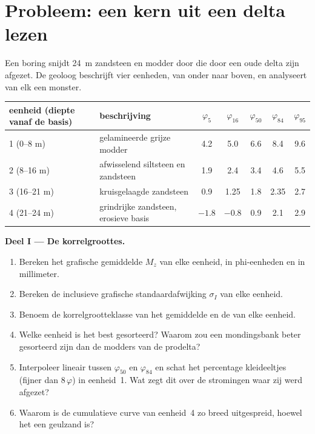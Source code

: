 \section{Probleem: een kern uit een delta lezen}

\begin{problem}
\label{pb:b1:clastic-sediments:1}
Een boring snijdt \qty{24}{m} zandsteen en modder door die door een oude delta
zijn afgezet. De geoloog beschrijft vier eenheden, van onder naar boven, en
analyseert van elk een monster.

\smallskip
\begin{center}\small
\begin{tabular}{@{}llccccc@{}}
\hline
eenheid (diepte vanaf de basis) & beschrijving & $\varphi_5$ & $\varphi_{16}$ & $\varphi_{50}$ & $\varphi_{84}$ & $\varphi_{95}$ \\
\hline
1 (0--8 m) & gelamineerde grijze modder & 4.2 & 5.0 & 6.6 & 8.4 & 9.6 \\
2 (8--16 m) & afwisselend siltsteen en zandsteen & 1.9 & 2.4 & 3.4 & 4.6 & 5.5 \\
3 (16--21 m) & kruisgelaagde zandsteen & 0.9 & 1.25 & 1.8 & 2.35 & 2.7 \\
4 (21--24 m) & grindrijke zandsteen, erosieve basis & $-1.8$ & $-0.8$ & 0.9 & 2.1 & 2.9 \\
\hline
\end{tabular}
\end{center}

\medskip
\noindent\textbf{Deel I --- De korrelgroottes.}
\begin{enumerate}
  \item Bereken het grafische gemiddelde $M_z$ van elke eenheid, in phi-eenheden
        en in millimeter.
  \item Bereken de inclusieve grafische standaardafwijking $\sigma_I$ van elke
        eenheid.
  \item Benoem de korrelgrootteklasse van het gemiddelde en de  van
        elke eenheid.
  \item Welke eenheid is het best gesorteerd? Waarom zou een mondingsbank beter
        gesorteerd zijn dan de modders van de prodelta?
  \item Interpoleer lineair tussen $\varphi_{50}$ en $\varphi_{84}$ en schat het
        percentage kleideeltjes (fijner dan $8\,\varphi$) in eenheid~1. Wat zegt
        dit over de stromingen waar zij werd afgezet?
  \item Waarom is de cumulatieve curve van eenheid~4 zo breed uitgespreid,
        hoewel het een geulzand is?
\end{enumerate}


\end{problem}
